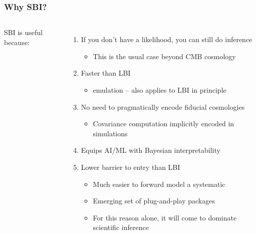 \documentclass[aspectratio=169]{beamer}
\begin{document}
\begin{frame}
    \frametitle{Why SBI?}
    \begin{columns}
        SBI is useful because:
        \begin{enumerate}
            \item If you don't have a likelihood, you can still do inference
                \begin{itemize}
                    \item This is the usual case beyond CMB cosmology
                \end{itemize}
            \item Faster than LBI
                \begin{itemize}
                    \item emulation -- also applies to LBI in principle
                \end{itemize}
            \item No need to pragmatically encode fiducial cosmologies
                \begin{itemize}
                    \item Covariance computation implicitly encoded in simulations
                \end{itemize}
            \item Equips AI/ML with Bayesian interpretability
            \item Lower barrier to entry than LBI
                \begin{itemize}
                    \item Much easier to forward model a systematic
                    \item Emerging set of plug-and-play packages
                    \item For this reason alone, it will come to dominate scientific inference
                \end{itemize}
        \end{enumerate}


\end{columns}
\end{frame}
\end{document}

